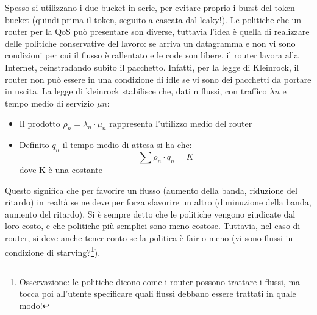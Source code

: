 Spesso si utilizzano i due bucket in serie, per evitare proprio i burst del token bucket (quindi prima il token, 
seguito a cascata dal leaky!).
Le politiche che un router per la QoS può presentare son diverse, tuttavia l'idea è quella di realizzare delle 
politiche conservative del lavoro: se arriva un datagramma e non vi sono condizioni per cui il flusso è rallentato 
e le code son libere, il router lavora alla Internet, reinstradando subito il pacchetto. Infatti, per la legge di
Kleinrock, il router non può essere in una condizione di idle se vi sono dei pacchetti da portare in uscita. La legge
di kleinrock stabilisce che, dati n flussi, con traffico $\lambda n$ e tempo medio di servizio $\mu n$:
\begin{itemize}
 \item Il prodotto $\rho_n = \lambda_n \cdot \mu_n$ rappresenta l'utilizzo medio del router
 \item Definito $q_n$ il tempo medio di attesa si ha che:
 \begin{equation}
  \sum \rho_n \cdot q_n = K
 \end{equation}
 dove K è una costante
\end{itemize}
Questo significa che per favorire un flusso (aumento della banda, riduzione del ritardo) in realtà se ne deve per 
forza sfavorire un altro (diminuzione della banda, aumento del ritardo).
Si è sempre detto che le politiche vengono giudicate dal loro costo, e che politiche più semplici sono meno costose.
Tuttavia, nel caso di router, si deve anche tener conto se la politica è fair o meno (vi sono flussi in condizione di
starving?\footnote{Osservazione: le politiche dicono come i router possono trattare i flussi, ma tocca poi all’utente
specificare quali flussi debbano essere trattati in quale modo!}).

